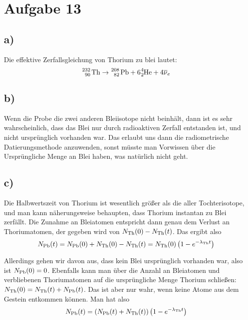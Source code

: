 \documentclass[12pt]{article}
\begin{document}
\section{Aufgabe 13}

\subsection{a)}

Die effektive Zerfallsgleichung von Thorium zu blei lautet:
\begin{equation*}
    \ce{^{232}_{90} Th} \rightarrow \ce{^{208}_{82} Pb} + 6 \ce{^4_2He} + 4\overline{\nu}_e
\end{equation*}

\subsection{b)}

Wenn die Probe die zwei anderen Bleiisotope nicht beinhält, dann ist es sehr wahrscheinlich, dass das Blei nur durch radioaktiven Zerfall entstanden ist, und nicht ursprünglich vorhanden war. Das erlaubt uns dann die radiometrische Datierungsmethode anzuwenden, sonst müsste man Vorwissen über die Ursprüngliche Menge an Blei haben, was natürlich nicht geht.

\subsection{c)}

Die Halbwertszeit von Thorium ist wesentlich größer als die aller Tochterisotope, und man kann näherungsweise behaupten, dass Thorium instantan zu Blei zerfällt. Die Zunahme an Bleiatomen entspricht dann genau dem Verlust an Thoriumatomen, der gegeben wird von $N_{\ce{Th}}(0) - N_{\ce{Th}}(t)$. Das ergibt also
\begin{equation*}
    N_{\ce{Pb}} (t) = N_{\ce{Pb}}(0) + N_{\ce{Th}}(0) - N_{\ce{Th}}(t) = N_{\ce{Th}}(0) \left(1 - e^{-\lambda_{\ce{Th}} t} \right)
\end{equation*}

Allerdings gehen wir davon aus, dass kein Blei ursprünglich vorhanden war, also ist $N_{\ce{Pb}}(0) = 0$. Ebenfalls kann man über die Anzahl an Bleiatomen und verbliebenen Thoriumatomen auf die ursprüngliche Menge Thorium schließen: $N_{\ce{Th}}(0) = N_{\ce{Th}}(t) + N_{\ce{Pb}}(t)$. Das ist aber nur wahr, wenn keine Atome aus dem Gestein entkommen können. Man hat also
\begin{equation*}
    N_{\ce{Pb}}(t) = (N_{\ce{Pb}}(t) + N_{\ce{Th}}(t)) \left(1 - e^{-\lambda_{\ce{Th}} t} \right)
\end{equation*}
\end{document}
